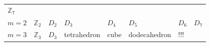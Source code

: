 \documentclass{article}
\begin{document}
\begin{longtable}[]{@{}llllllll@{}}
\begin{minipage}[t]{0.10\columnwidth}
\(\mathbb{Z}_7\)\strut
\end{minipage}\tabularnewline
\begin{minipage}[t]{0.10\columnwidth}\raggedright
\(m=2\)\strut
\end{minipage} & \begin{minipage}[t]{0.10\columnwidth}\raggedright
\(\mathbb{Z}_2\)\strut
\end{minipage} & \begin{minipage}[t]{0.10\columnwidth}\raggedright
\(D_2\)\strut
\end{minipage} & \begin{minipage}[t]{0.10\columnwidth}\raggedright
\(D_3\)\strut
\end{minipage} & \begin{minipage}[t]{0.10\columnwidth}\raggedright
\(D_4\)\strut
\end{minipage} & \begin{minipage}[t]{0.10\columnwidth}\raggedright
\(D_5\)\strut
\end{minipage} & \begin{minipage}[t]{0.10\columnwidth}\raggedright
\(D_6\)\strut
\end{minipage} & \begin{minipage}[t]{0.10\columnwidth}\raggedright
\(D_7\)\strut
\end{minipage}\tabularnewline
\begin{minipage}[t]{0.10\columnwidth}\raggedright
\(m=3\)\strut
\end{minipage} & \begin{minipage}[t]{0.10\columnwidth}\raggedright
\(\mathbb{Z}_3\)\strut
\end{minipage} & \begin{minipage}[t]{0.10\columnwidth}\raggedright
\(D_3\)\strut
\end{minipage} & \begin{minipage}[t]{0.10\columnwidth}\raggedright
tetrahedron\strut
\end{minipage} & \begin{minipage}[t]{0.10\columnwidth}\raggedright
cube\strut
\end{minipage} & \begin{minipage}[t]{0.10\columnwidth}\raggedright
dodecahedron\strut
\end{minipage} & \begin{minipage}[t]{0.10\columnwidth}\raggedright
!!!\strut
\end{minipage} & \begin{minipage}[t]{0.10\columnwidth}\raggedright

\end{minipage}
\end{longtable}
\end{document}
